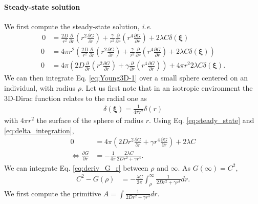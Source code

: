 \documentclass[12pt,english]{article}
\begin{document}
\paragraph*{Steady-state solution}

We first compute the steady-state solution,\textit{ i.e.} 
\begin{align}
\,0 & =\frac{2D}{r^{2}}\frac{\partial}{\partial r}\left(r^{2}\frac{\partial G}{\partial r}\right)+\frac{\gamma}{r^{2}}\frac{\partial}{\partial r}\left(r^{4}\frac{\partial G}{\partial r}\right)+2\lambda C\delta(\boldsymbol{\xi})\nonumber \\
0 & =4\pi r^{2}\left(\frac{2D}{r^{2}}\frac{\partial}{\partial r}\left(r^{2}\frac{\partial G}{\partial r}\right)+\frac{\gamma}{r^{2}}\frac{\partial}{\partial r}\left(r^{4}\frac{\partial G}{\partial r}\right)+2\lambda C\delta(\boldsymbol{\boldsymbol{\xi}})\right)\nonumber \\
0 & =4\pi\left(2D\frac{\partial}{\partial r}\left(r^{2}\frac{\partial G}{\partial r}\right)+\gamma\frac{\partial}{\partial r}\left(r^{4}\frac{\partial G}{\partial r}\right)\right)+4\pi r^{2}2\lambda C\delta(\boldsymbol{\boldsymbol{\xi}}).\label{eq:steady_state}
\end{align}
We can then integrate Eq. \ref{eq:Young3D-1} over a small sphere
centered on an individual, with radius $\rho$. Let us first note
that in an isotropic environment the 3D-Dirac function relates to the radial one as
\begin{align}
 \delta(\boldsymbol{\xi}) =  \frac{1}{4 \pi r^2}\delta(r) \label{eq:delta_integration}%
\end{align}
with $4\pi r^2$ the surface of the sphere of radius $r$.
Using Eq. \ref{eq:steady_state} and \ref{eq:delta_integration},
\begin{align}
0 & =4\pi\left(2Dr^{2}\frac{\partial G}{\partial r}+\gamma r^{4}\frac{\partial G}{\partial r}\right)+2\lambda C\nonumber \\
\Leftrightarrow\frac{\partial G}{\partial r} & =-\frac{1}{4\pi}\frac{2\lambda C}{2Dr^{2}+\gamma r^{4}}.\label{eq:deriv_G_r}
\end{align}
We can integrate Eq. \ref{eq:deriv_G_r} between $\rho$ and $\infty$.
As $G(\infty)=C^{2},$ 
\begin{align}
C^{2}-G(\rho) & =-\frac{\lambda C}{2\pi}{\displaystyle \int_{\rho}^{\infty}}\frac{1}{2Dr^{2}+\gamma r^{4}}dr.\label{eq:deriv_G_r_int1}
\end{align}
We first compute the primitive $A=\int\frac{1}{2Dr^{2}+\gamma r^{4}}dr$.
\end{document}
